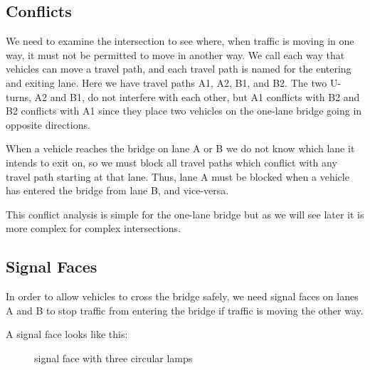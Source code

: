 \documentclass[letterpaper,twoside]{article}
\begin{document}
\subsection{Conflicts}

We need to examine the intersection to see where, when traffic is moving
in one way, it must not be permitted to move in another way.  We call each
way that vehicles can move a travel path, and each travel path is named
for the entering and exiting lane.  Here we have travel paths A1, A2, B1,
and B2.  The two U-turns, A2 and B1, do not interfere with each other, but
A1 conflicts with B2 and B2 conflicts with A1 since they place two vehicles
on the one-lane bridge going in opposite directions.

When a vehicle reaches the bridge on lane A or B we do not
know which lane it intends to exit on, so we must block all travel paths
which conflict with any travel path starting at that lane.  Thus,
lane A must be blocked when a vehicle has entered the bridge from lane B,
and vice-versa.

This conflict analysis is simple for the one-lane bridge but as we will see
later it is more complex for complex intersections.

\subsection{Signal Faces}

In order to allow vehicles to cross the bridge safely, we need signal
faces on lanes A and B to stop traffic from entering the bridge if
traffic is moving the other way.

A signal face looks like this:

\begin{figure}[H]
           {\caption{signal face with three circular lamps}
             \label{fig:signal_ccc}}
\end{figure}
\end{document}
